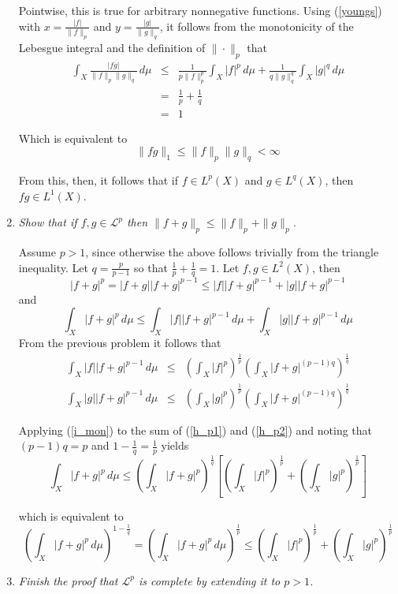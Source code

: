 \documentclass[letterpaper,11pt]{article}
\begin{document}
\begin{enumerate}
Pointwise, this is true for arbitrary nonnegative functions.  Using (\ref{youngs}) with $x = \frac{|f|}{\|f\|_p}$ and $y=\frac{|g|}{\|g\|_q}$, it follows from the monotonicity of the Lebesgue integral and the definition of $\| \cdot \|_p$ that
\begin{eqnarray*}
\int_X \frac{|fg|}{\|f\|_p \|g\|_q} \,d\mu &\leq& \frac{1}{p\|f\|_p^p} \int_X |f|^p \,d\mu + \frac{1}{q\|g\|_q^q} \int_X |g|^q \,d\mu \\
&=& \frac{1}{p} + \frac{1}{q} \\
&=& 1
\end{eqnarray*}

Which is equivalent to
\[
\|fg\|_1 \leq \|f\|_p\|g\|_q < \infty
\]

From this, then, it follows that if $f \in L^p(X)$ and $g \in L^q(X)$, then $fg \in L^1(X)$.
\item \emph{Show that if $f,g \in \mathcal{L}^p$ then $\|f+g\|_p \leq \|f\|_p + \|g\|_p$.}

Assume $p>1$, since otherwise the above follows trivially from the triangle inequality.  Let $q = \frac{p}{p-1}$ so that $\frac{1}{p} + \frac{1}{q} = 1$.  Let $f,g \in L^2(X)$, then
\[
|f+g|^p = |f+g||f+g|^{p-1} \leq |f||f+g|^{p-1} + |g||f+g|^{p-1}
\]
and
\begin{equation}
\label{i_mon}
\int_X |f+g|^p \,d\mu \leq \int_X |f||f+g|^{p-1} \,d\mu + \int_X |g||f+g|^{p-1} \,d\mu
\end{equation}
From the previous problem it follows that
\begin{eqnarray}
\label{h_p1}
\int_X |f||f+g|^{p-1} \,d\mu &\leq& \left(\int_X |f|^p\right)^{\frac{1}{p}}\left(\int_X |f+g|^{(p-1)q}\right)^{\frac{1}{q}} \\
\label{h_p2}
\int_X |g||f+g|^{p-1} \,d\mu &\leq& \left(\int_X |g|^p\right)^{\frac{1}{p}}\left(\int_X |f+g|^{(p-1)q}\right)^{\frac{1}{q}}
\end{eqnarray}

Applying (\ref{i_mon}) to the sum of (\ref{h_p1}) and (\ref{h_p2}) and noting that $(p-1)q = p$ and $1 - \frac{1}{q} = \frac{1}{p}$ yields
\[
\int_X |f+g|^p \,d\mu \leq \left(\int_X |f+g|^p\right)^{\frac{1}{q}} \left[\left(\int_X |f|^p\right)^{\frac{1}{p}} + \left(\int_X |g|^p\right)^{\frac{1}{p}}\right]
\]

which is equivalent to
\[
\left(\int_X |f+g|^p \,d\mu\right)^{1-\frac{1}{q}} = \left(\int_X |f+g|^p \,d\mu\right)^{\frac{1}{p}} \leq \left(\int_X |f|^p\right)^{\frac{1}{p}} + \left(\int_X |g|^p\right)^{\frac{1}{p}}
\]
\item \emph{Finish the proof that $\mathcal{L}^p$ is complete by extending it to $p > 1$.}


\end{enumerate}
\end{document}
